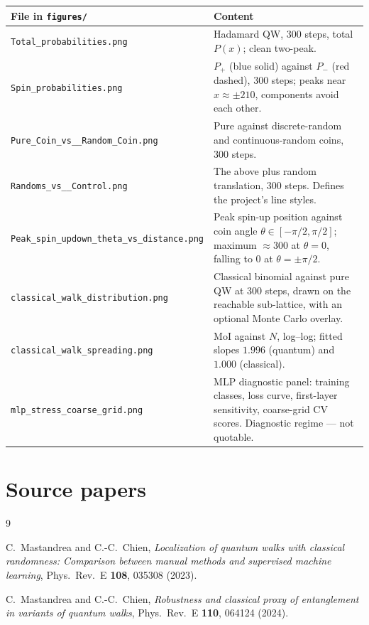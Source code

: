 \documentclass[11pt]{article}
\newcommand{\MoI}{\mathrm{MoI}}
\begin{document}
\begin{longtable}{p{} p{}}
\toprule
\textbf{File in \texttt{figures/}} & \textbf{Content} \\
\midrule
\endhead
\texttt{Total\_probabilities.png}
  & Hadamard QW, 300 steps, total $P(x)$; clean two-peak. \\
\texttt{Spin\_probabilities.png}
  & $P_+$ (blue solid) against $P_-$ (red dashed), 300 steps; peaks near
    $x \approx \pm 210$, components avoid each other. \\
\texttt{Pure\_Coin\_vs\_\_Random\_Coin.png}
  & Pure against discrete-random and continuous-random coins, 300 steps. \\
\texttt{Randoms\_vs\_\_Control.png}
  & The above plus random translation, 300 steps. Defines the project's line
    styles. \\
\texttt{Peak\_spin\_updown\_theta\_vs\_distance.png}
  & Peak spin-up position against coin angle $\theta \in [-\pi/2,\pi/2]$;
    maximum $\approx 300$ at $\theta=0$, falling to $0$ at $\theta=\pm\pi/2$. \\
\texttt{classical\_walk\_distribution.png}
  & Classical binomial against pure QW at 300 steps, drawn on the reachable
    sub-lattice, with an optional Monte Carlo overlay. \\
\texttt{classical\_walk\_spreading.png}
  & $\MoI$ against $N$, log--log; fitted slopes $1.996$ (quantum) and
    $1.000$ (classical). \\
\texttt{mlp\_stress\_coarse\_grid.png}
  & MLP diagnostic panel: training classes, loss curve, first-layer
    sensitivity, coarse-grid CV scores. Diagnostic regime --- not quotable. \\
\bottomrule
\end{longtable}

\section*{Source papers}

\begin{thebibliography}{9}

C.~Mastandrea and C.-C.~Chien,
\emph{Localization of quantum walks with classical randomness: Comparison
between manual methods and supervised machine learning},
Phys.\ Rev.\ E \textbf{108}, 035308 (2023).

C.~Mastandrea and C.-C.~Chien,
\emph{Robustness and classical proxy of entanglement in variants of quantum
walks},
Phys.\ Rev.\ E \textbf{110}, 064124 (2024).

\end{thebibliography}
\end{document}
